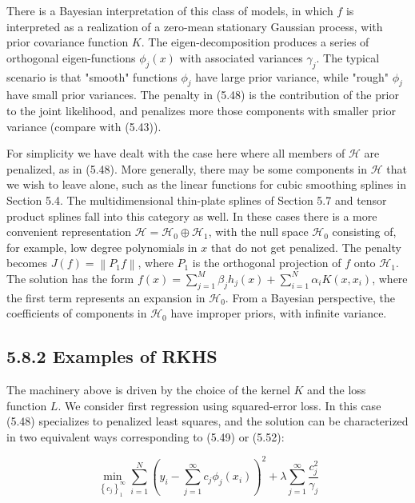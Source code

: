 \documentclass[10pt]{article}
\begin{document}
There is a Bayesian interpretation of this class of models, in which $f$ is interpreted as a realization of a zero-mean stationary Gaussian process, with prior covariance function $K$. The eigen-decomposition produces a series of orthogonal eigen-functions $\phi_{j}(x)$ with associated variances $\gamma_{j}$. The typical scenario is that "smooth" functions $\phi_{j}$ have large prior variance, while "rough" $\phi_{j}$ have small prior variances. The penalty in (5.48) is the contribution of the prior to the joint likelihood, and penalizes more those components with smaller prior variance (compare with (5.43)).

For simplicity we have dealt with the case here where all members of $\mathcal{H}$ are penalized, as in (5.48). More generally, there may be some components in $\mathcal{H}$ that we wish to leave alone, such as the linear functions for cubic smoothing splines in Section 5.4. The multidimensional thin-plate splines of Section 5.7 and tensor product splines fall into this category as well. In these cases there is a more convenient representation $\mathcal{H}=\mathcal{H}_{0} \oplus \mathcal{H}_{1}$, with the null space $\mathcal{H}_{0}$ consisting of, for example, low degree polynomials in $x$ that do not get penalized. The penalty becomes $J(f)=\left\|P_{1} f\right\|$, where $P_{1}$ is the orthogonal projection of $f$ onto $\mathcal{H}_{1}$. The solution has the form $f(x)=\sum_{j=1}^{M} \beta_{j} h_{j}(x)+\sum_{i=1}^{N} \alpha_{i} K\left(x, x_{i}\right)$, where the first term represents an expansion in $\mathcal{H}_{0}$. From a Bayesian perspective, the coefficients of components in $\mathcal{H}_{0}$ have improper priors, with infinite variance.

\subsection*{5.8.2 Examples of RKHS}
The machinery above is driven by the choice of the kernel $K$ and the loss function $L$. We consider first regression using squared-error loss. In this case (5.48) specializes to penalized least squares, and the solution can be characterized in two equivalent ways corresponding to (5.49) or (5.52):


\begin{equation*}
\min _{\left\{c_{j}\right\}_{1}^{\infty}} \sum_{i=1}^{N}\left(y_{i}-\sum_{j=1}^{\infty} c_{j} \phi_{j}\left(x_{i}\right)\right)^{2}+\lambda \sum_{j=1}^{\infty} \frac{c_{j}^{2}}{\gamma_{j}} \tag{5.53}
\end{equation*}
\end{document}
